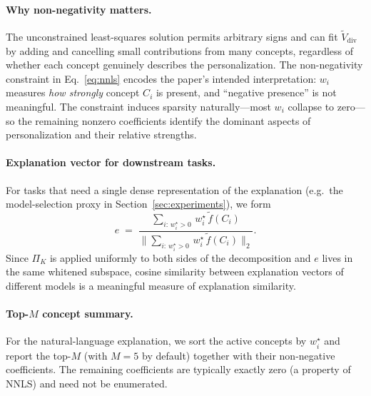 \paragraph{Why non-negativity matters.}
The unconstrained least-squares solution permits arbitrary signs and can
fit $\widetilde{V}_{\mathrm{div}}$ by adding and cancelling small
contributions from many concepts, regardless of whether each concept
genuinely describes the personalization. The non-negativity constraint
in Eq.~\eqref{eq:nnls} encodes the paper's intended interpretation:
$w_i$ measures \emph{how strongly} concept $C_i$ is present, and
``negative presence'' is not meaningful. The constraint induces sparsity
naturally---most $w_i$ collapse to zero---so the remaining nonzero
coefficients identify the dominant aspects of personalization and their
relative strengths.

\paragraph{Explanation vector for downstream tasks.}
For tasks that need a single dense representation of the explanation (e.g.\
the model-selection proxy in Section~\ref{sec:experiments}), we form
\begin{equation}
\label{eq:expl_vec}
e \;=\; \frac{
  \sum_{i:\, w_i^\star>0}\, w_i^\star\,\widetilde{f}(C_i)
}{
  \bigl\|\sum_{i:\, w_i^\star>0}\, w_i^\star\,\widetilde{f}(C_i)\bigr\|_2
}.
\end{equation}
Since $\Pi_K$ is applied uniformly to both sides of the decomposition and
$e$ lives in the same whitened subspace, cosine similarity between
explanation vectors of different models is a meaningful measure of
explanation similarity.

\paragraph{Top-$M$ concept summary.}
For the natural-language explanation, we sort the active concepts by $w_i^\star$
and report the top-$M$ (with $M{=}5$ by default) together with their
non-negative coefficients. The remaining coefficients are typically
exactly zero (a property of NNLS) and need not be enumerated.

